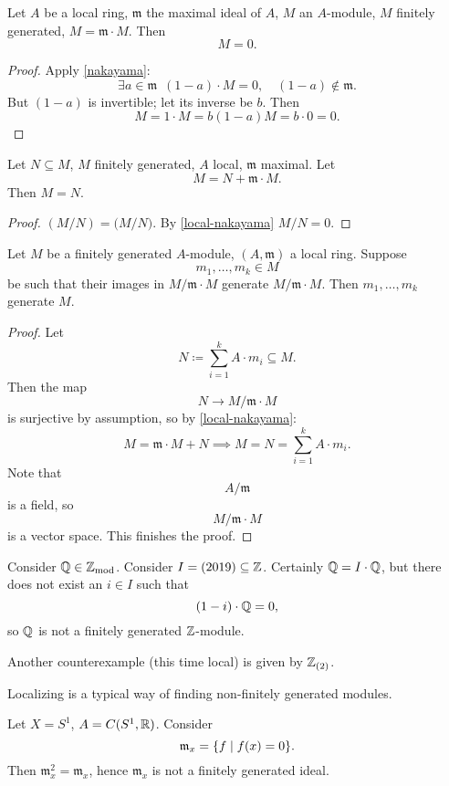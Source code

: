 \begin{corollary}
  \label{local-nakayama}
  Let $A$ be a local ring, $\mathfrak m$ the maximal ideal of $A$, $M$ an $A$-module, $M$ finitely generated, $M = \mathfrak m \cdot M$. Then
  \[ M = 0.\]
\end{corollary}
\begin{proof}
  Apply \cref{nakayama}:
  \[ \exists a \in \mathfrak m \enspace (1-a) \cdot M = 0, \quad (1-a) \notin \mathfrak m.\]
  But $(1 - a)$ is invertible; let its inverse be $b$. Then
  \[ M = 1 \cdot M = b(1-a) M = b \cdot 0 = 0.\]
\end{proof}

\begin{corollary}
  \label{local-nakayama2}
  Let $N \subseteq M$, $M$ finitely generated, $A$ local, $\mathfrak m$ maximal. Let
  \[ M = N + \mathfrak m \cdot M.\]
  Then $M = N$.
\end{corollary}
\begin{proof}
  $(M / {N}) = \mathfrak (M / {N})$.
  By \cref{local-nakayama}
  $M / {N} = 0$.
\end{proof}

\begin{corollary}
  Let $M$ be a finitely generated $A$-module, $(A, \mathfrak m)$ a local ring. Suppose
  \[ m_1, \dotsc, m_k \in M\]
  be such that their images in $M / {\mathfrak m \cdot M}$ generate $M / {\mathfrak m \cdot M}$. Then $m_1, \dotsc, m_k$ generate $M$.
\end{corollary}
\begin{proof}
  Let
  \[ N \coloneqq \sum_{i=1}^k A \cdot m_i \subseteq M.\]
  Then the map
  \[ N \to M / {\mathfrak m \cdot M}\]
  is surjective by assumption, so by \cref{local-nakayama}:
  \[ M = \mathfrak m \cdot M + N \implies M = N = \sum_{i=1}^k A \cdot m_i.\]
  Note that
  \[ A / {\mathfrak m}\]
  is a field, so
  \[ M / {\mathfrak m \cdot M}\]
  is a vector space. This finishes the proof.
\end{proof}

\begin{example}
  Consider $\mathbb Q \in \mathbb Z_\text{mod}$. Consider $I = (2019) \subseteq \mathbb Z$.
  Certainly $\mathbb Q = I \cdot \mathbb Q$, but there does not exist an $i \in I$ such that
  \[ (1-i) \cdot \mathbb Q = 0,\]
  so $\mathbb Q$ is not a finitely generated $\mathbb Z$-module. 
\end{example}

\begin{example}
  Another counterexample (this time local) is given by $\mathbb Z_{(2)}$.
\end{example}

\begin{note}
  Localizing is a typical way of finding non-finitely generated modules.
\end{note}

\begin{example}
  Let $X = S^1$, $A = C(S^1, \mathbb R)$. Consider
  \[ \mathfrak m_x = \{ f \mathrel{|} f(x) = 0 \}. \]
  Then $\mathfrak m_x^2 = \mathfrak m_x$, hence $\mathfrak m_x$ is not a finitely generated ideal.
\end{example}

